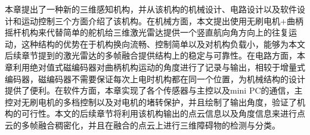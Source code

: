 本章提出了一种新的三维感知机构，并从该机构的机械设计、电路设计以及软件设计和运动控制三个方面介绍了该机构。在机械方面，本文提出使用无刷电机$+$曲柄摇杆机构来代替简单的舵机给三维激光雷达提供一个竖直航向角方向上的往复运动，这种结构的优势在于机构换向流畅、控制简单以及对机构负载小，能够为本文后续章节提到的激光雷达的多帧融合提供结构上的稳定与可靠性。在电路方面，本章利用绝对值式磁编码器对曲柄机构运动的角度进行了记录与输出，相较于增量式编码器，磁编码器不需要保证每次上电时机构都在同一个位置，为机械结构的设计提供了便利。在软件方面，本章实现了各个传感器与主控以及mini PC的通信，主控对无刷电机的多档控制以及对电机的堵转保护，并且绘制了输出角度，验证了机构的可行性。本文的后续章节将利用该机构输出的点云信息以及角度信息来进行点云的多帧融合稠密化，并且在融合的点云上进行三维障碍物的检测与分类。